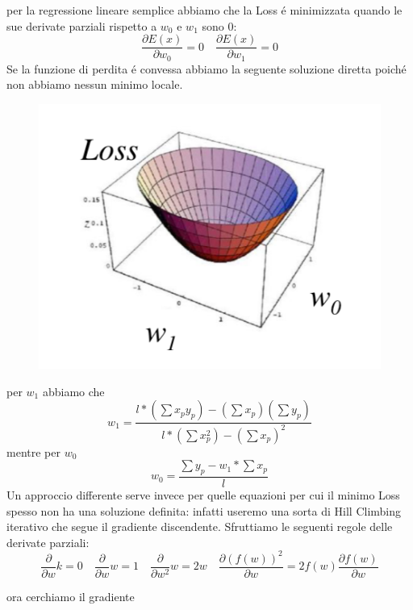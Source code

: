 \documentclass{article}
\begin{document}
per la regressione lineare semplice abbiamo che la Loss é minimizzata quando le sue derivate parziali rispetto a $w_0$ e $w_1$ sono 0:
\begin{equation}
    \frac{\partial E(x)}{\partial w_0} = 0 \quad \frac{\partial E(x)}{\partial w_1} = 0
\end{equation}
Se la funzione di perdita é convessa abbiamo la seguente soluzione diretta poiché non abbiamo nessun minimo locale. 
\begin{figure}[H]
    \centering
    \includegraphics[scale=0.8]{Images/convexlocalmin.png}
\end{figure}
per $w_1$ abbiamo che
\begin{equation}
    w_1 = \frac{l * (\sum x_py_p) - (\sum x_p) (\sum y_p)}{l * (\sum x_p^2) - (\sum x_p)^2}
\end{equation}
mentre per $w_0$
\begin{equation}
    w_0 = \frac{\sum y_p - w_1 * \sum x_p}{l}
\end{equation}
Un approccio differente serve invece per quelle equazioni per cui il minimo Loss spesso non ha una soluzione definita: infatti useremo una sorta di Hill Climbing iterativo che segue il gradiente discendente. Sfruttiamo le seguenti regole delle derivate parziali:
\begin{equation}
   \frac{\partial}{\partial w}k = 0 \quad \frac{\partial}{\partial w}w = 1 \quad \frac{\partial}{\partial w^2}w = 2w \quad \frac{\partial (f(w))^2}{\partial w} = 2f(w) \frac{\partial f(w)}{\partial w}
\end{equation}

ora cerchiamo il gradiente
\end{document}
